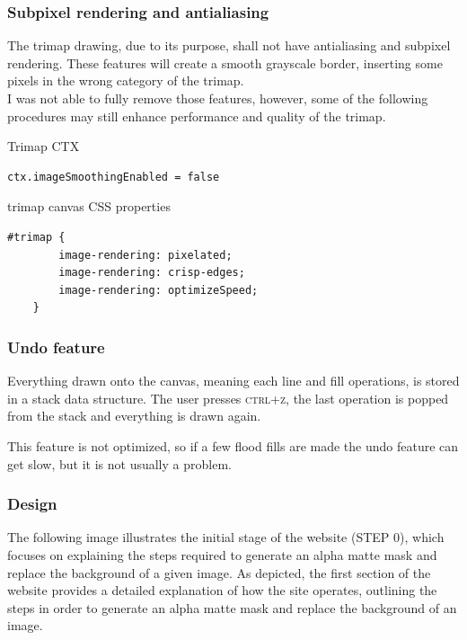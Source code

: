 \documentclass[a4paper]{article}
\begin{document}
\pagebreak

\subsubsection{Subpixel rendering and antialiasing}

The \gls{trimap} drawing, due to its purpose, shall not have antialiasing
and subpixel rendering. These features will create a smooth grayscale border,
inserting some pixels in the wrong category of the \gls{trimap}. \\

I was not able to fully remove those features, however, some of the following
procedures may still enhance performance and quality of the \gls{trimap}.

{\color{gray}Trimap CTX}
\begin{lstlisting}[style=JS, style=boxed]
    ctx.imageSmoothingEnabled = false
\end{lstlisting}

\Gls{trimap} canvas \gls{CSS} properties
\begin{lstlisting}[style=JS, style=boxed]
    #trimap {
        image-rendering: pixelated;
        image-rendering: crisp-edges;
        image-rendering: optimizeSpeed;
    }
\end{lstlisting}

\subsubsection{Undo feature}

Everything drawn onto the canvas, meaning each line and fill operations,
is stored in a stack data structure.
The user presses \textsc{ctrl+z}, the last operation
is popped from the stack and everything is drawn again.

This feature is not optimized, so if a few flood fills are
made the undo feature can get slow, but it is not usually a problem.

\pagebreak

\subsubsection{Design}

The following image illustrates the initial stage of the
website (\textsc{STEP 0}),
which focuses on explaining the steps required to generate an
alpha \gls{matte} mask and replace the background of a given image.
As depicted, the first section of the website provides a detailed
explanation of how the site operates,
outlining the steps in order to generate an alpha \gls{matte}
mask and replace the background of an image.
\end{document}
